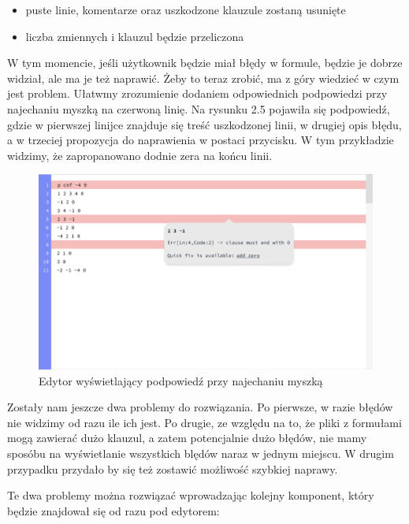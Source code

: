 \documentclass[a4paper,12pt,oneside]{book}
\theoremstyle{definition}
\begin{document}
\begin{itemize}
    \item puste linie, komentarze oraz uszkodzone klauzule zostaną usunięte
    \item liczba zmiennych i klauzul będzie przeliczona
\end{itemize}

W tym momencie, jeśli użytkownik będzie miał błędy w formule, będzie je dobrze widział, ale ma je też naprawić. Żeby to teraz zrobić, ma z góry wiedzieć w czym jest problem. Ułatwmy zrozumienie dodaniem odpowiednich podpowiedzi przy najechaniu myszką na czerwoną linię. Na rysunku 2.5 pojawiła się podpowiedź, gdzie w pierwszej linijce znajduje się treść uszkodzonej linii, w drugiej opis błędu, a w trzeciej propozycja do naprawienia w postaci przycisku. W tym przykładzie widzimy, że zapropanowano dodnie zera na końcu linii.

\begin{figure}[ht]
    \centering
    \includegraphics[width=14.30cm]{5}
    \caption{Edytor wyświetlający podpowiedź przy najechaniu myszką}
    \label{fig:5}
\end{figure}

\newpage

Zostały nam jeszcze dwa problemy do rozwiązania. Po pierwsze, w razie błędów nie widzimy od razu ile ich jest. Po drugie, ze względu na to, że pliki z formułami mogą zawierać dużo klauzul, a zatem potencjalnie dużo błędów, nie mamy sposóbu na wyświetlanie wszystkich blędów naraz w jednym miejscu. W drugim przypadku przydało by się też zostawić możliwość szybkiej naprawy. 

Te dwa problemy można rozwiązać wprowadzając kolejny komponent, który będzie znajdował się od razu pod edytorem: 
\end{document}
